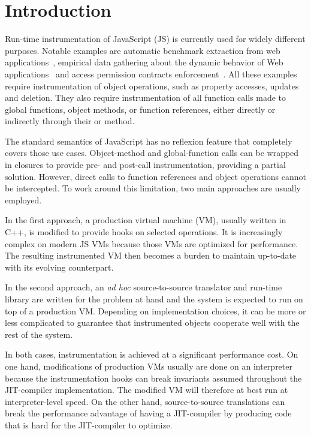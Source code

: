 \chapter{Introduction}

Run-time instrumentation of JavaScript (JS) is currently used for widely different
purposes.  Notable examples are automatic benchmark extraction from web
applications~\cite{Richards:2011}, empirical data gathering about the dynamic
behavior of Web applications~\cite{behavior_js} and access permission contracts
enforcement~\cite{Heidegger:2012}. All these examples require instrumentation
of object operations, such as property accesses, updates and deletion. They
also require instrumentation of all function calls made to global functions,
object methods, or function references, either directly or indirectly through
their  or  method.

The standard semantics of JavaScript has no reflexion feature that completely
covers those use cases. Object-method and global-function calls can be wrapped
in closures to provide pre- and post-call instrumentation, providing a partial
solution.  However, direct calls to function references and object operations
cannot be intercepted. To work around this limitation, two main approaches are
usually employed.

In the first approach, a production virtual machine (VM), usually written in
C++, is modified to provide hooks on selected operations. It is increasingly
complex on modern JS VMs because those VMs are optimized for performance. The
resulting instrumented VM then becomes a burden to maintain up-to-date with its
evolving counterpart.

In the second approach, an \textit{ad hoc} source-to-source translator and
run-time library are written for the problem at hand and the system is expected
to run on top of a production VM. Depending on implementation choices, it can
be more or less complicated to guarantee that instrumented objects cooperate
well with the rest of the system. 

In both cases, instrumentation is achieved at a significant performance cost.
On one hand, modifications of production VMs usually are done on an interpreter
because the instrumentation hooks can break invariants assumed throughout the
JIT-compiler implementation. The modified VM will therefore at best run at
interpreter-level speed. On the other hand, source-to-source translations can
break the performance advantage of having a JIT-compiler by producing code
that is hard for the JIT-compiler to optimize.

